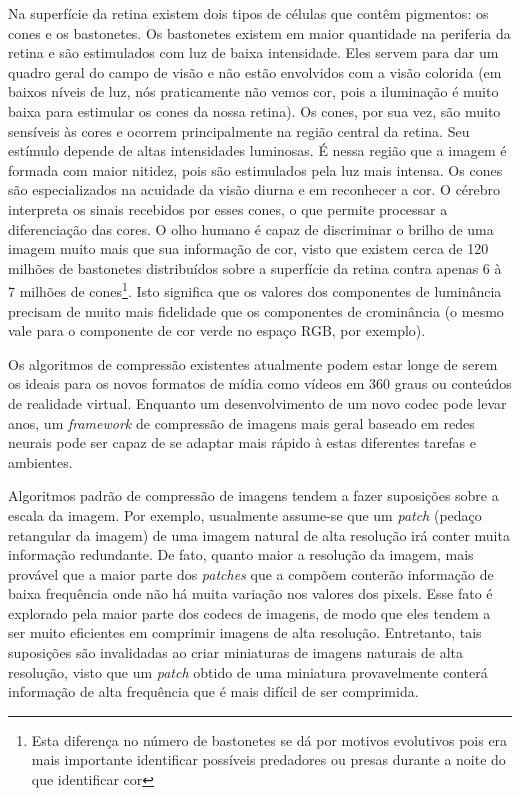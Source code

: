 Na superfície da retina existem dois tipos de células que contêm pigmentos: os cones e os bastonetes. Os bastonetes existem em maior quantidade na periferia da retina e são estimulados com luz de baixa intensidade. Eles servem para dar um quadro geral do campo de visão e não estão envolvidos com a visão colorida (em baixos níveis de luz, nós praticamente não vemos cor, pois a iluminação é muito baixa para estimular os cones da nossa retina). Os cones, por sua vez, são muito sensíveis às cores e ocorrem principalmente na região central da retina. Seu estímulo depende de altas intensidades luminosas. É nessa região que a imagem é formada com maior nitidez, pois são estimulados pela luz mais intensa. Os cones são especializados na acuidade da visão diurna e em reconhecer a cor. O cérebro interpreta os sinais recebidos por esses cones, o que permite processar a diferenciação das cores. O olho humano é capaz de discriminar o brilho de uma imagem muito mais que sua informação de cor, visto que existem cerca de 120 milhões de bastonetes distribuídos sobre a superfície da retina contra apenas 6 à 7 milhões de cones\footnote{Esta diferença no número de bastonetes se dá por motivos evolutivos pois era mais importante identificar possíveis predadores ou presas durante a noite do que identificar cor}. Isto significa que os valores dos componentes de luminância precisam de muito mais fidelidade que os componentes de crominância (o mesmo vale para o componente de cor verde no espaço RGB, por exemplo).

Os algoritmos de compressão existentes atualmente podem estar longe de serem os ideais para os novos formatos de mídia como vídeos em 360 graus ou conteúdos de realidade virtual. Enquanto um desenvolvimento de um novo codec pode levar anos, um \textit{framework} de compressão de imagens mais geral baseado em redes neurais pode ser capaz de se adaptar mais rápido à estas diferentes tarefas e ambientes.

Algoritmos padrão de compressão de imagens tendem a fazer suposições sobre a escala da imagem. Por exemplo, usualmente assume-se que um \textit{patch} (pedaço retangular da imagem) de uma imagem natural de alta resolução irá conter muita informação redundante. De fato, quanto maior a resolução da imagem, mais provável que a maior parte dos \textit{patches} que a compõem conterão informação de baixa frequência onde não há muita variação nos valores dos pixels. Esse fato é explorado pela maior parte dos codecs de imagens, de modo que eles tendem a ser muito eficientes em comprimir imagens de alta resolução. Entretanto, tais suposições são invalidadas ao criar miniaturas de imagens naturais de alta resolução, visto que um \textit{patch} obtido de uma miniatura provavelmente conterá informação de alta frequência que é mais difícil de ser comprimida.

